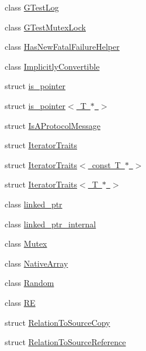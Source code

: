\begin{DoxyCompactItemize}
\item 
class \mbox{\hyperlink{classtesting_1_1internal_1_1_g_test_log}{G\+Test\+Log}}
\item 
class \mbox{\hyperlink{classtesting_1_1internal_1_1_g_test_mutex_lock}{G\+Test\+Mutex\+Lock}}
\item 
class \mbox{\hyperlink{classtesting_1_1internal_1_1_has_new_fatal_failure_helper}{Has\+New\+Fatal\+Failure\+Helper}}
\item 
class \mbox{\hyperlink{classtesting_1_1internal_1_1_implicitly_convertible}{Implicitly\+Convertible}}
\item 
struct \mbox{\hyperlink{structtesting_1_1internal_1_1is__pointer}{is\+\_\+pointer}}
\item 
struct \mbox{\hyperlink{structtesting_1_1internal_1_1is__pointer_3_01_t_01_5_01_4}{is\+\_\+pointer$<$ T $\ast$ $>$}}
\item 
struct \mbox{\hyperlink{structtesting_1_1internal_1_1_is_a_protocol_message}{Is\+A\+Protocol\+Message}}
\item 
struct \mbox{\hyperlink{structtesting_1_1internal_1_1_iterator_traits}{Iterator\+Traits}}
\item 
struct \mbox{\hyperlink{structtesting_1_1internal_1_1_iterator_traits_3_01const_01_t_01_5_01_4}{Iterator\+Traits$<$ const T $\ast$ $>$}}
\item 
struct \mbox{\hyperlink{structtesting_1_1internal_1_1_iterator_traits_3_01_t_01_5_01_4}{Iterator\+Traits$<$ T $\ast$ $>$}}
\item 
class \mbox{\hyperlink{classtesting_1_1internal_1_1linked__ptr}{linked\+\_\+ptr}}
\item 
class \mbox{\hyperlink{classtesting_1_1internal_1_1linked__ptr__internal}{linked\+\_\+ptr\+\_\+internal}}
\item 
class \mbox{\hyperlink{classtesting_1_1internal_1_1_mutex}{Mutex}}
\item 
class \mbox{\hyperlink{classtesting_1_1internal_1_1_native_array}{Native\+Array}}
\item 
class \mbox{\hyperlink{classtesting_1_1internal_1_1_random}{Random}}
\item 
class \mbox{\hyperlink{classtesting_1_1internal_1_1_r_e}{RE}}
\item 
struct \mbox{\hyperlink{structtesting_1_1internal_1_1_relation_to_source_copy}{Relation\+To\+Source\+Copy}}
\item 
struct \mbox{\hyperlink{structtesting_1_1internal_1_1_relation_to_source_reference}{Relation\+To\+Source\+Reference}}
\item 

\end{DoxyCompactItemize}
